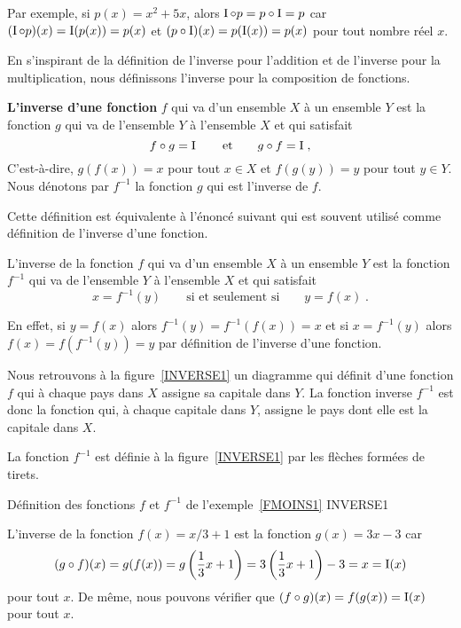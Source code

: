 {\begin{egg}
Par exemple, si $p(x) = x^2 + 5x$, alors $\operatorname{I} \circ p = p \circ \operatorname{I} = p$
car $(\operatorname{I} \circ p)(x) = \operatorname{I}(p(x)) = p(x)$ et
$(p \circ \operatorname{I})(x) = p(\operatorname{I}(x)) = p(x)$ pour tout nombre réel $x$.
\end{egg}

En s'inspirant de la définition de l'inverse pour l'addition et de
l'inverse pour la multiplication, nous définissons l'inverse pour la
composition de fonctions.

\begin{defn} 
{\bfseries L'inverse d'une fonction} $f$ qui
va d'un ensemble $X$ à un ensemble $Y$ est la fonction $g$ qui va de
l'ensemble $Y$ à l'ensemble $X$ et qui satisfait
\[
f\circ g = \operatorname{I} \qquad \text{et}  \qquad  g \circ f = \operatorname{I} \; ,
\]
C'est-à-dire, $g(f(x)) = x$ pour tout $x \in X$ et $f(g(y)) = y$
pour tout $y\in Y$.  Nous dénotons par $f^{-1}$ la fonction $g$ qui est
l'inverse de $f$.
\end{defn}

Cette définition est équivalente à l'énoncé suivant qui est
souvent utilisé comme défini\-tion de l'inverse d'une fonction.

\begin{defn}
L'inverse de la fonction $f$ qui va d'un ensemble $X$ à un ensemble
$Y$ est la fonction $f^{-1}$ qui va de l'ensemble $Y$ à l'ensemble $X$
et qui satisfait
\[
x = f^{-1}(y) \qquad \text{si et seulement si} \qquad y = f(x) \; .
\]
\end{defn}

En effet, si $y=f(x)$ alors $f^{-1}(y) = f^{-1}(f(x)) = x$ et si
$x = f^{-1}(y)$ alors $f(x) = f(f^{-1}(y)) = y$ par définition de l'inverse
d'une fonction.

\begin{egg}
Nous retrouvons à la figure~\ref{INVERSE1} un diagramme qui définit
d'une fonction $f$ qui à chaque pays dans $X$ assigne sa capitale dans
$Y$.  La fonction inverse $f^{-1}$ est donc la fonction qui, à chaque
capitale dans $Y$, assigne le pays dont elle est la capitale dans $X$.

La fonction $f^{-1}$ est définie à la figure~\ref{INVERSE1} par les
flèches formées de tirets.
\label{FMOINS1}
\end{egg}

{Définition des fonctions $f$ et $f^{-1}$ de l'exemple~\ref{FMOINS1}}
{INVERSE1}

\begin{egg}
L'inverse de la fonction $f(x) = x/3 + 1$ est la fonction $g(x) = 3x - 3$ car
\[
(g \circ f)(x) = g(f(x)) = g\left( \frac{1}{3}x + 1 \right)
= 3\left(\frac{1}{3}x+1\right) - 3 = x = \operatorname{I}(x)
\]
pour tout $x$.  De même, nous pouvons vérifier que
$(f \circ g)(x) = f(g(x)) = \operatorname{I}(x)$ pour tout $x$.


\end{egg}}
